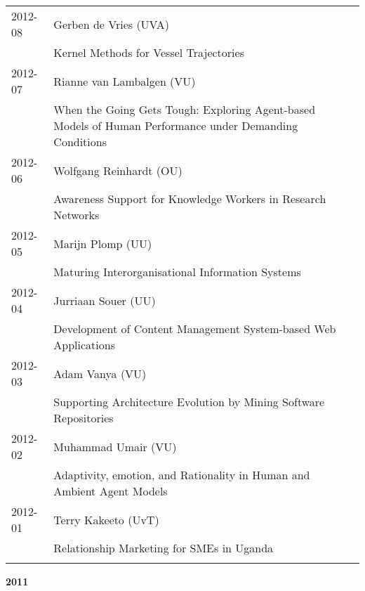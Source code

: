 \begin{longtable}{p{1.25cm}p{10.75cm}}
2012-08 & Gerben de Vries (UVA) \\& Kernel Methods for Vessel Trajectories \\
2012-07 & Rianne van Lambalgen (VU) \\& When the Going Gets Tough: Exploring Agent-based Models of Human Performance under Demanding Conditions \\
2012-06 & Wolfgang Reinhardt (OU) \\& Awareness Support for Knowledge Workers in Research Networks \\
2012-05 & Marijn Plomp (UU) \\& Maturing Interorganisational Information Systems \\
2012-04 & Jurriaan Souer (UU) \\& Development of Content Management System-based Web Applications \\
2012-03 & Adam Vanya (VU) \\& Supporting Architecture Evolution by Mining Software Repositories \\
2012-02 & Muhammad Umair (VU) \\& Adaptivity, emotion, and Rationality in Human and Ambient Agent Models \\
2012-01 & Terry Kakeeto (UvT) \\& Relationship Marketing for SMEs in Uganda \\
\\
\end{longtable}

\begin{center}
	\large{\textbf{2011}}
\end{center}


